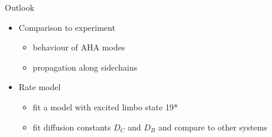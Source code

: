 \begin{frame}[c]{Outlook}
  \begin{itemize}
    \item Comparison to experiment
    \begin{itemize}
      \item behaviour of AHA modes
      \item propagation along sidechains 
    \end{itemize}
    \vspace{5mm}
    \item Rate model
    \begin{itemize}
      \item fit a model with excited limbo state 19*
      \item fit diffusion constants $D_C$ and $D_B$ and compare to other systems
    \end{itemize}
  \end{itemize}

\end{frame}


